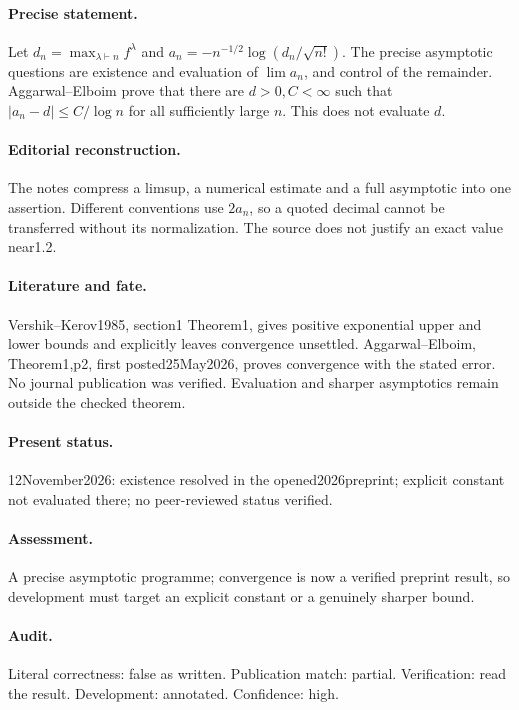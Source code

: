 \paragraph{Precise statement.} Let $d_n=\max_{\lambda\vdash n}f^\lambda$ and $a_n=-n^{-1/2}\log(d_n/\sqrt{n!})$. The precise asymptotic questions are existence and evaluation of $\lim a_n$, and control of the remainder. Aggarwal--Elboim prove that there are $d>0,C<\infty$ such that $|a_n-d|\le C/\log n$ for all sufficiently large $n$. This does not evaluate $d$.

\paragraph{Editorial reconstruction.} The notes compress a limsup, a numerical estimate and a full asymptotic into one assertion. Different conventions use $2a_n$, so a quoted decimal cannot be transferred without its normalization. The source does not justify an exact value near1.2.

\paragraph{Literature and fate.} Vershik--Kerov1985, section1 Theorem1, gives positive exponential upper and lower bounds and explicitly leaves convergence unsettled. Aggarwal--Elboim, Theorem1,p2, first posted25May2026, proves convergence with the stated error. No journal publication was verified. Evaluation and sharper asymptotics remain outside the checked theorem.

\paragraph{Present status.} 12November2026: existence resolved in the opened2026preprint; explicit constant not evaluated there; no peer-reviewed status verified.

\paragraph{Assessment.} A precise asymptotic programme; convergence is now a verified preprint result, so development must target an explicit constant or a genuinely sharper bound.

\paragraph{Audit.} Literal correctness: false as written. Publication match: partial. Verification: read the result. Development: annotated. Confidence: high.

